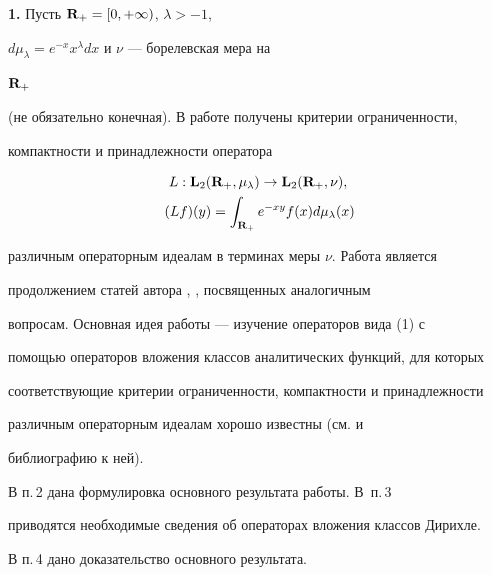 \maketitle


\label{begin}





{\bf 1.} Пусть $\bold R_+=[0,+\infty)$, $\lambda>-1$,


$d\mu_\lambda=e^{-x}x^\lambda dx$ и $\nu$ --- борелевская мера на


$\bold R_+$


(не обязательно конечная). В работе получены критерии ограниченности,


компактности и принадлежности оператора


\begin{equation}


\begin{split}


L:\bold L_2(&\bold R_+,\mu_\lambda)\to\bold L_2(\bold R_+,\nu),\\


(Lf)(y)&=\int_{\bold R_+}e^{-xy}f(x)d\mu_\lambda (x)


\end{split}


\end{equation}


различным операторным идеалам в терминах меры $\nu$. Работа является


продолжением статей автора \cite{1}, \cite{2}, посвященных аналогичным


вопросам. Основная идея работы --- изучение операторов вида (1) с


помощью операторов вложения классов аналитических функций, для которых


соответствующие критерии ограниченности, компактности и принадлежности


различным операторным идеалам хорошо известны (см. \cite{1} и


библиографию к ней).





В п.\,2 дана формулировка основного результата работы. В~п.\,3


приводятся необходимые сведения об операторах вложения классов Дирихле.


В п.\,4 дано доказательство основного результата.


\medskip





